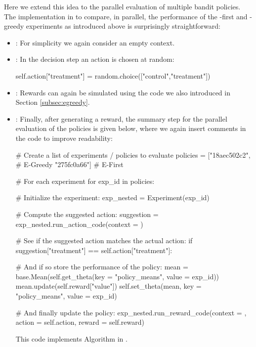 \documentclass[nojss]{jss}
\begin{document}
Here we extend this idea to the parallel evaluation of multiple bandit policies. The implementation in  to compare, in parallel, the performance of the -first and -greedy experiments as introduced above is surprisingly straightforward:
\begin{itemize}
\item {}: For simplicity we again consider an empty context.
\item {}: In the decision step an action is chosen at random:
\begin{Code}
self.action["treatment"] = random.choice(["control","treatment"])
\end{Code}

\item {}: Rewards can again be simulated using the code we also introduced in Section \ref{subsec:egreedy}.
\item {}: Finally, after generating a reward, the summary step for the parallel evaluation of the policies is given below, where we again insert comments in the code to improve readability:
\begin{Code}
# Create a list of experiments / policies to evaluate
policies = ["18aec502c2", # E-Greedy
                 "275fc0a66"] # E-First

# For each experiment
for exp_id in policies:

    # Initialize the experiment:
    exp_nested = Experiment(exp_id)
    
    # Compute the suggested action:
    suggestion = exp_nested.run_action_code(context = {})
    
    # See if the suggested action matches the actual action:
    if suggestion["treatment"] == self.action["treatment"]:
        
        # And if so store the performance of the policy:
        mean = base.Mean(self.get_theta(key = "policy_means", 
        				value = exp_id))
        mean.update(self.reward["value"])
        self.set_theta(mean, key = "policy_means", value = exp_id)
        
        # And finally update the policy:
        exp_nested.run_reward_code(context = {}, 
        		action = self.action, reward = self.reward)
\end{Code}
This code implements Algorithm  in \citep{Li2010a}.
\end{itemize}
\end{document}
